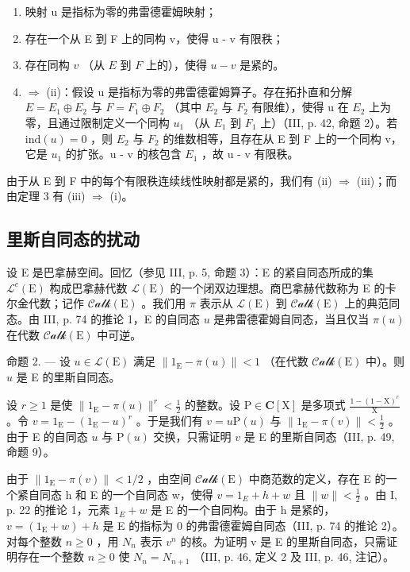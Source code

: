 \begin{enumerate}
\def\labelenumi{(\roman{enumi})}
\item
  映射 u 是指标为零的弗雷德霍姆映射；
\item
  存在一个从 E 到 F 上的同构 v，使得 u - v 有限秩；
\item
  存在同构 \(v\) （从 \(E\) 到 \(F\) 上的），使得 \(u - v\) 是紧的。
\item
  \(\Longrightarrow\) (ii)：假设 u 是指标为零的弗雷德霍姆算子。存在拓扑直和分解 \(E = E_{1} \oplus E_{2}\) 与 \(F = F_{1} \oplus F_{2}\) （其中 \(E_{2}\) 与 \(F_{2}\) 有限维），使得 u 在 \(E_{2}\) 上为零，且通过限制定义一个同构 \(u_{1}\) （从 \(E_{1}\) 到 \(F_{1}\) 上）（III, p. 42, 命题 2）。若 \(\text{ind}(u) = 0\) ，则 \(E_{2}\) 与 \(F_{2}\) 的维数相等，且存在从 E 到 F 上的一个同构 v，它是 \(u_{1}\) 的扩张。u - v 的核包含 \(E_{1}\) ，故 u - v 有限秩。
\end{enumerate}

由于从 E 到 F 中的每个有限秩连续线性映射都是紧的，我们有 (ii) \(\Longrightarrow\) (iii)；而由定理 3 有 (iii) \(\Longrightarrow\) (i)。

\subsection{里斯自同态的扰动}

设 E 是巴拿赫空间。回忆（参见 III, p. 5, 命题 3）：E 的紧自同态所成的集 \(\mathcal{L}^c (\mathrm{E})\) 构成巴拿赫代数 \(\mathcal{L}(\mathrm{E})\) 的一个闭双边理想。商巴拿赫代数称为 E 的卡尔金代数；记作 \(\mathcal{Calk}(\mathrm{E})\) 。我们用 \(\pi\) 表示从 \(\mathcal{L}(\mathrm{E})\) 到 \(\mathcal{Calk}(\mathrm{E})\) 上的典范同态。由 III, p. 74 的推论 1，E 的自同态 \(u\) 是弗雷德霍姆自同态，当且仅当 \(\pi (u)\) 在代数 \(\mathcal{Calk}(\mathrm{E})\) 中可逆。

命题 2. --- 设 \(u \in \mathcal{L}(\mathrm{E})\) 满足 \(\|1_{\mathrm{E}} - \pi(u)\| < 1\) （在代数 \(\mathcal{Calk}(\mathrm{E})\) 中）。则 \(u\) 是 E 的里斯自同态。

设 \(r \geqslant 1\) 是使 \(\| 1_{\mathrm{E}} - \pi(u)\|^{r} < \frac{1}{2}\) 的整数。设 \(\mathrm{P} \in \mathbf{C}[\mathrm{X}]\) 是多项式 \(\frac{1 - (1 - \mathrm{X})^r}{\mathrm{X}}\) 。令 \(v = 1_{\mathrm{E}} - (1_{\mathrm{E}} - u)^r\) 。于是我们有 \(v = u\mathrm{P}(u)\) 与 \(\| 1_{\mathrm{E}} - \pi(v)\| < \frac{1}{2}\) 。由于 E 的自同态 \(u\) 与 \(\mathrm{P}(u)\) 交换，只需证明 \(v\) 是 E 的里斯自同态（III, p. 49, 命题 9）。

由于 \(\|1_{\mathrm{E}}-\pi(v)\|<1/2\) ，由空间 \(\mathcal{Calk}(\mathrm{E})\) 中商范数的定义，存在 E 的一个紧自同态 h 和 E 的一个自同态 w，使得 \(v=1_{E}+h+w\) 且 \(\|w\|<\frac{1}{2}\) 。由 I, p. 22 的推论 1，元素 \(1_{E}+w\) 是 E 的一个自同构。由于 h 是紧的，\(v=(1_{\mathrm{E}}+w)+h\) 是 E 的指标为 0 的弗雷德霍姆自同态（III, p. 74 的推论 2）。对每个整数 \(n\geqslant0\) ，用 \(N_{n}\) 表示 \(v^{n}\) 的核。为证明 v 是 E 的里斯自同态，只需证明存在一个整数 \(n \geqslant 0\) 使 \(N_{n} = N_{n+1}\) （III, p. 46, 定义 2 及 III, p. 46, 注记）。

